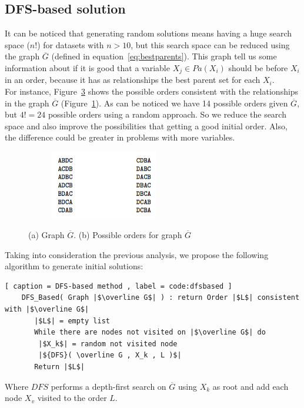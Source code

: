 \subsection{DFS-based solution}
\label{subsec:dfsapproach}
	It can be noticed that generating random solutions means having a huge search space ($n!$) for datasets with $n > 10$, but this search space can be reduced using the graph $\overline G$ (defined in equation~\ref{eq:bestparents}). This graph tell us some information about if it is good that a variable $X_j \in {Pa}( X_i )$ should be before $X_i$ in an order, because it has as relationships the best parent set for each $X_i$.\\
	For instance, Figure~\ref{fig:dfsorders} shows the possible orders consistent with the relationships in the graph $\overline G$ (Figure~\ref{fig:example}). As can be noticed we have 14 possible orders given $\overline{G}$, but $4! = 24$ possible orders using a random approach. So we reduce the search space and also improve the possibilities that getting a good initial order. Also, the difference could be greater in problems with more variables.
	\begin{figure}[H]
	 	\centering
	 	\begin{subfigure}{.48\textwidth}
	 		\centering
			
			\caption{}
			\label{fig:example}
	 	\end{subfigure}
	 	\begin{subfigure}{.48\textwidth}
	 		\centering
			\includegraphics[height=3cm]{images/dfsorders}
			\caption{}
			\label{fig:dfsorders}
	 	\end{subfigure}
		\caption{(a) Graph $\overline{G}$. (b) Possible orders for graph $\overline G$}
	\end{figure}
	Taking into consideration the previous analysis, we propose the following algorithm to generate initial solutions:
	\begin{lstlisting}[ caption = DFS-based method , label = code:dfsbased ]
	DFS_Based( Graph |$\overline G$| ) : return Order |$L$| consistent with |$\overline G$|
	   |$L$| = empty list
	   While there are nodes not visited on |$\overline G$| do
		|$X_k$| = random not visited node
		|${DFS}( \overline G , X_k , L )$|
	   Return |$L$|
	\end{lstlisting}
	Where ${DFS}$ performs a depth-first search on $\overline G$ using $X_k$ as root and add each node $X_v$ visited to the order $L$.
	

